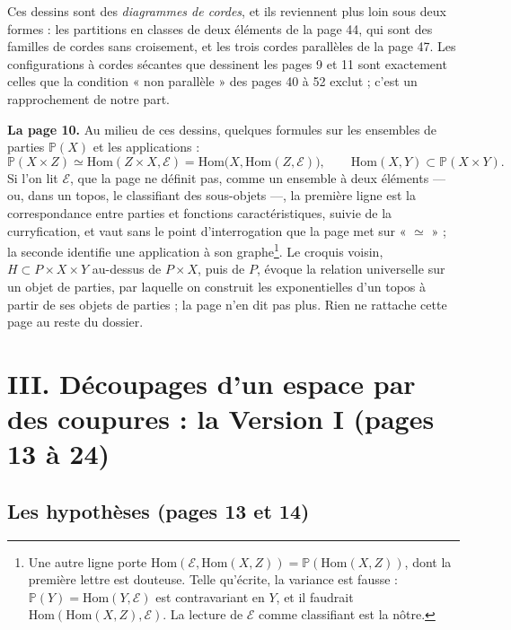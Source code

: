 \documentclass[11pt,a4paper]{article}
\begin{document}
Ces dessins sont des \emph{diagrammes de cordes}, et ils reviennent plus
loin sous deux formes : les partitions en classes de deux éléments de la
page 44, qui sont des familles de cordes sans croisement, et les trois
cordes parallèles de la page 47. Les configurations à cordes sécantes que
dessinent les pages 9 et 11 sont exactement celles que la condition « non
parallèle » des pages 40 à 52 exclut ; c'est un rapprochement de notre
part.

\textbf{La page 10.} Au milieu de ces dessins, quelques formules sur les
ensembles de parties $\mathbb{P}(X)$ et les applications :
\[
\mathbb{P}(X \times Z) \simeq \mathrm{Hom}(Z \times X, \mathcal{E}) =
\mathrm{Hom}\bigl(X, \mathrm{Hom}(Z, \mathcal{E})\bigr), \qquad
\mathrm{Hom}(X, Y) \subset \mathbb{P}(X \times Y).
\]
Si l'on lit $\mathcal{E}$, que la page ne définit pas, comme un ensemble à
deux éléments --- ou, dans un topos, le classifiant des sous-objets ---, la
première ligne est la correspondance entre parties et fonctions
caractéristiques, suivie de la curryfication, et vaut sans le point
d'interrogation que la page met sur « $\simeq$ » ; la seconde identifie une
application à son graphe\footnote{Une autre ligne porte
$\mathrm{Hom}(\mathcal{E}, \mathrm{Hom}(X,Z)) =
\mathbb{P}(\mathrm{Hom}(X,Z))$, dont la première lettre est douteuse. Telle
qu'écrite, la variance est fausse : $\mathbb{P}(Y) = \mathrm{Hom}(Y,
\mathcal{E})$ est contravariant en $Y$, et il faudrait
$\mathrm{Hom}(\mathrm{Hom}(X,Z), \mathcal{E})$. La lecture de $\mathcal{E}$
comme classifiant est la nôtre.}. Le croquis voisin, $H \subset P \times X
\times Y$ au-dessus de $P \times X$, puis de $P$, évoque la relation
universelle sur un objet de parties, par laquelle on construit les
exponentielles d'un topos à partir de ses objets de parties ; la page n'en
dit pas plus. Rien ne rattache cette page au reste du dossier.

\section*{III. Découpages d'un espace par des coupures : la Version I (pages 13 à 24)}

\subsection*{Les hypothèses (pages 13 et 14)}
\end{document}
